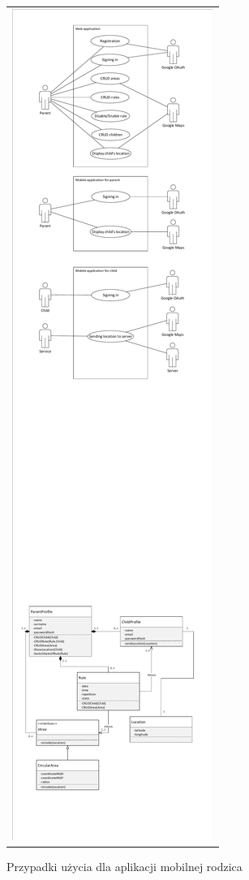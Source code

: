 \documentclass{sprawozdanie-agh}
\begin{document}
		\begin{figure}[H]
			\centering
			\begin{tabular}{c}
				\includegraphics[width=.80\textwidth]{parentUseCase} 
			\end{tabular} 
		\caption{Przypadki użycia dla aplikacji mobilnej rodzica}
		\end{figure} 
\end{document}
